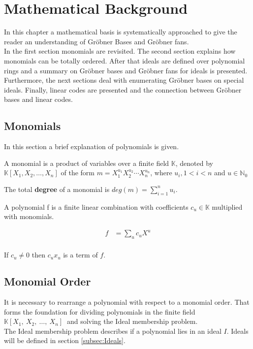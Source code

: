 \section{Mathematical Background}
\label{sec:background}

In this chapter a mathematical basis is systematically approached to give the reader an understanding of Gröbner Bases and Gröbner fans.\\
In the first section monomials are revisited. The second section explains how monomials can be totally ordered.
After that ideals are defined over polynomial rings and a summary on Gröbner bases and Gröbner fans for ideals is presented. Furthermore, the next sections deal with enumerating Gröbner bases on special ideals. Finally, linear codes are presented and the connection between Gröbner bases and linear codes.  

\subsection{Monomials}
\label{subseb:Monomials}

In this section a brief explanation of polynomials is given.

\begin{env_definition}[Monomial] 
\cite{KHZ}
A monomial is a product of variables over a finite field $\mathbb{K}$, denoted by $ \mathbb{K} \left[X_{1},X_{2},\dots, X_{n}\right]  $ of the form $m= X_{1}^{u_{1}}X_{2}^{u_{2}}\cdots X_{n}^{u_{n}}$, where $u_{i}, 1 < i < n $ and $u \in \mathbb{N}_{0} $
\end{env_definition}
The total \textbf{degree} of a monomial is $deg(m) = \sum_{i=1}^n u_i $. 


\begin{env_definition}[Polynomial]
\cite{KHZ}
A polynomial f is a finite linear combination with coefficients $c_{u} \in \mathbb{K}$ multiplied with monomials.


\begin{align*}
	f &= \sum_{u} c_{u}X^{u} \\
\end{align*}

\end{env_definition}
If $c_{u}\neq0$ then $c_{u}x_{u}$ is a term of $f$.





\subsection{Monomial Order}
\label{subsec:Monomialorder}
It is necessary to rearrange a polynomial with respect to a monomial order. That forms the foundation for dividing polynomials in the finite field
$ \mathbb{K} \left[X_{1},~X_{2},~\dots,~X_{n}\right]~$ and solving the Ideal membership problem.\\
The Ideal membership problem describes if a polynomial lies in an ideal $I$. Ideals will be defined in section \ref{subsec:Ideals}.

